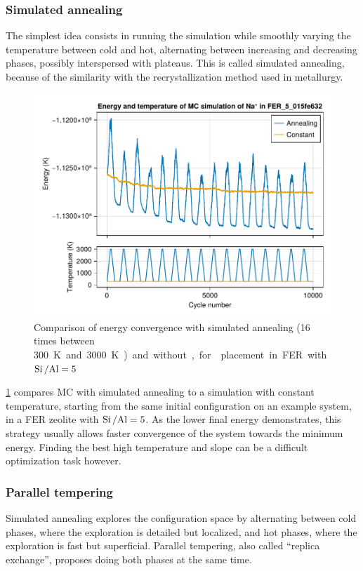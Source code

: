 \documentclass[main.tex]{subfiles}
\begin{document}
\subsubsection{Simulated annealing}

The simplest idea consists in running the simulation while smoothly varying the temperature between cold and hot, alternating between increasing and decreasing phases, possibly interspersed with plateaus. This is called simulated annealing, because of the similarity with the recrystallization method used in metallurgy.

\begin{figure}
	\centering
	\includegraphics[width=0.8\linewidth]{figures/cations/annealing.pdf}
	\caption{Comparison of energy convergence with simulated annealing (\num{16} times between \qty{300}K and \qty{3000}K) and without, for  placement in FER with $\mbox{Si\,/Al} = 5$}\label{fig:annealing}
\end{figure}

\cref{fig:annealing} compares MC with simulated annealing to a simulation with constant temperature, starting from the same initial configuration on an example system,  in a FER zeolite with $\mbox{Si\,/Al} = 5$. As the lower final energy demonstrates, this strategy usually allows faster convergence of the system towards the minimum energy. Finding the best high temperature and slope can be a difficult optimization task however.

\subsubsection{Parallel tempering}

\label{paralleltempering}

Simulated annealing explores the configuration space by alternating between cold phases, where the exploration is detailed but localized, and hot phases, where the exploration is fast but superficial. Parallel tempering, also called ``replica exchange'', proposes doing both phases at the same time.
\end{document}
